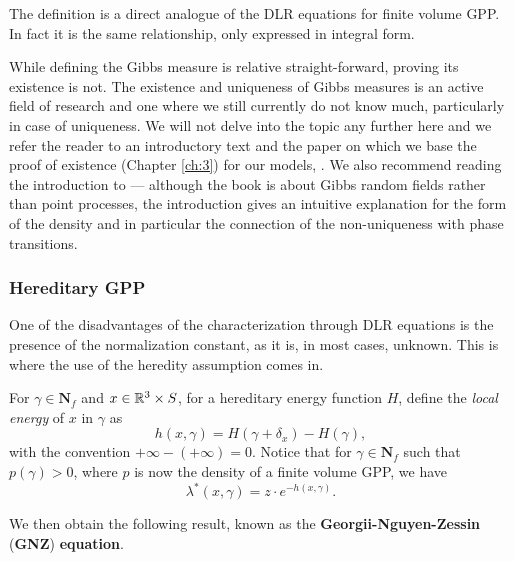 The definition is a direct analogue of the DLR equations for finite volume GPP. In fact it is the same relationship, only expressed in integral form.  \newline

While defining the Gibbs measure is relative straight-forward, proving its existence is not. The existence and uniqueness of Gibbs measures is an active field of research and one where we still currently do not know much, particularly in case of uniqueness.  We will not delve into the topic any further here and we refer the reader to an introductory text \cite{Dereudre2017} and the paper on which we base the proof of existence (Chapter \ref{ch:3}) for our models, \cite{DDG12}. We also recommend reading the introduction to \cite{Georgii2011} --- although the book is about Gibbs random fields rather than point processes, the introduction gives an intuitive explanation for the form of the density and in particular the connection of the non-uniqueness with phase transitions.

\subsubsection{Hereditary GPP}
One of the disadvantages of the characterization through DLR equations is the presence of the normalization constant, as it is, in most cases, unknown. This is where the use of the heredity assumption comes in.

For $\gamma \in \mathbf N_f$ and $x \in {\mathbb R^3}\times S$, for a hereditary energy function $H$, define the \textit{local energy} of $x$ in $\gamma$ as
$$h(x,\gamma) = H(\gamma + \delta_x) - H(\gamma),$$
with the convention $+\infty - (+\infty) = 0$. Notice that for $\gamma \in \mathbf N_f$ such that $p(\gamma) > 0$, where $p$ is now the density of a finite volume GPP, we have
$$\lambda^*(x,\gamma) = z \cdot e^{-h(x,\gamma)}.$$

We then obtain the following result, known as the \textbf{Georgii-Nguyen-Zessin }(\textbf{GNZ}) \textbf{equation}. 


